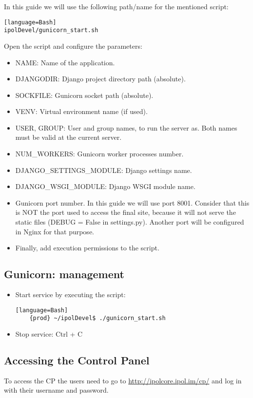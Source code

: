 \documentclass[a4paper,12pt]{article}
\begin{document}
In this guide we will use the following path/name for the mentioned script:
\begin{verbatim}[language=Bash]
ipolDevel/gunicorn_start.sh
\end{verbatim}

Open the script and configure the parameters:
\begin{itemize}
    \item NAME: Name of the application.
    \item DJANGODIR: Django project directory path (absolute).
    \item SOCKFILE: Gunicorn socket path (absolute).
    \item VENV: Virtual environment name (if used).
    \item USER, GROUP: User and group names, to run the server as. Both names must be valid at the current server.
    \item NUM\_WORKERS: Gunicorn worker processes number.
    \item DJANGO\_SETTINGS\_MODULE: Django settings name.
    \item DJANGO\_WSGI\_MODULE: Django WSGI module name.
    \item Gunicorn port number. In this guide we will use port 8001. Consider that this is NOT the port used to access the final site, because it will not serve the static files (DEBUG = False in settings.py). Another port will be configured in Nginx for that purpose.
    \item Finally, add execution permissions to the script.
\end{itemize}

\subsection{Gunicorn: management}
\begin{itemize}
    \item Start service by executing the script:
    \begin{verbatim}[language=Bash]
    {prod} ~/ipolDevel$ ./gunicorn_start.sh
    \end{verbatim}

    \item Stop service: Ctrl + C
\end{itemize}



\subsection{Accessing the Control Panel}
To access the CP the users need to go to \url{http://ipolcore.ipol.im/cp/} and log in with their username and password.
\end{document}

